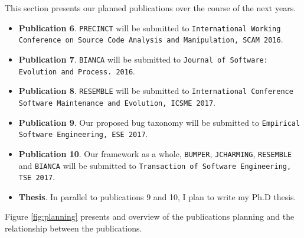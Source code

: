 This section presents our planned publications over the course of the next years.

\begin{itemize}
	\item {\bf Publication 6}. {\tt PRECINCT} will be submitted to {\tt International Working Conference on Source Code Analysis and Manipulation, SCAM 2016}.
	\item {\bf Publication 7}. {\tt BIANCA} will be submitted to {\tt Journal of Software: Evolution and Process. 2016}.
	\item {\bf Publication 8}. {\tt RESEMBLE} will be submitted to {\tt International Conference Software Maintenance and Evolution, ICSME 2017}.
	\item {\bf Publication 9}. Our proposed bug taxonomy will be submitted to {\tt Empirical Software Engineering, ESE 2017}.
	\item {\bf Publication 10}. Our framework as a whole, {\tt BUMPER}, {\tt JCHARMING}, {\tt RESEMBLE} and {\tt BIANCA} will be submitted to {\tt Transaction of Software Engineering, TSE 2017}.
	\item {\bf Thesis}. In parallel to publications 9 and 10, I plan to write my Ph.D thesis.
\end{itemize}

Figure \ref{fig:planning} presents and overview of the publications planning and the relationship between the publications.

